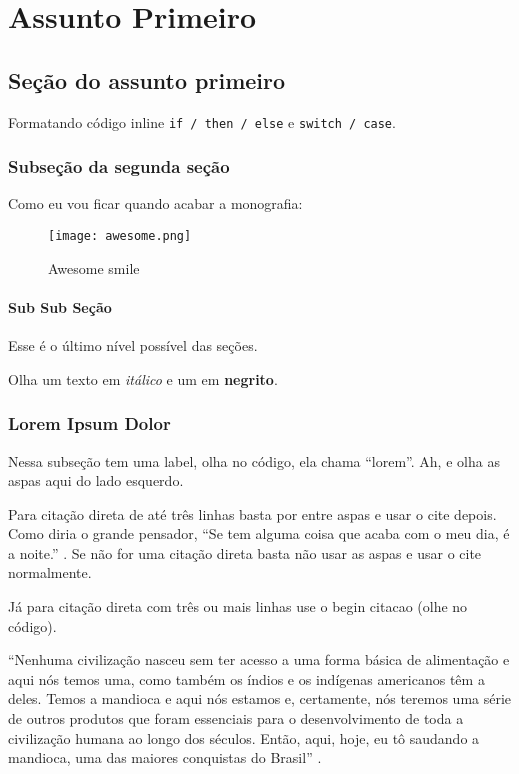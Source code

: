 \chapter{Assunto Primeiro}

\section{Seção do assunto primeiro}

Formatando código inline \texttt{if / then / else} e \texttt{switch / case}.

\subsection{Subseção da segunda seção}

Como eu vou ficar quando acabar a monografia:

\begin{figure}[H]
\centerline{\texttt{[image: awesome.png]}}
\caption{Awesome smile}
\end{figure}

\subsubsection{Sub Sub Seção}
     
Esse é o último nível possível das seções.

Olha um texto em \textit{itálico} e um em \textbf{negrito}.


\subsection{Lorem Ipsum Dolor}\label{sec:lorem}

Nessa subseção tem uma label, olha no código, ela chama ``lorem''. Ah, e olha as aspas aqui do lado esquerdo.

Para citação direta de até três linhas basta por entre aspas e usar o cite depois. Como diria o grande pensador,
``Se tem alguma coisa que acaba com o meu dia, é a noite.'' \cite{tiririca2009dia}. Se não for uma citação direta basta não usar as aspas e usar o cite normalmente.

Já para citação direta com três ou mais linhas use o begin citacao (olhe no código).

\begin{citacao}
``Nenhuma civilização nasceu sem ter acesso a uma forma básica de alimentação e aqui nós temos uma, como também os índios e os indígenas americanos têm a deles. Temos a mandioca e aqui nós estamos e, certamente, nós teremos uma série de outros produtos que foram essenciais para o desenvolvimento de toda a civilização humana ao longo dos séculos. Então, aqui, hoje, eu tô saudando a mandioca, uma das maiores conquistas do Brasil'' \cite{rousseff2015mandioca}.
\end{citacao}

